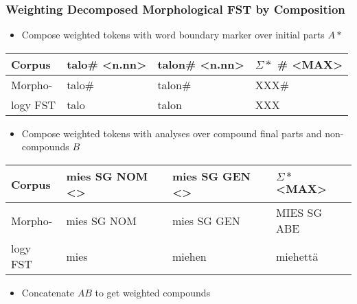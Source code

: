 \documentclass[utf8]{beamer}
\begin{document}
\begin{frame}
\frametitle{Weighting Decomposed Morphological FST by Composition}
\begin{itemize}
\item Compose weighted tokens with word boundary marker over initial parts $A*$
\end{itemize}
\begin{tabular}{l|l|l|l}
Corpus & talo\# <n.nn> & talon\# <n.nn> & $\Sigma*$ \# <MAX> \\
\hline
Morpho- & talo\# & talon\# & XXX\# \\
logy FST & talo & talon & XXX \\
\end{tabular}
\begin{itemize}
\item Compose weighted tokens with analyses over compound final parts and
non-compounds $B$
\end{itemize}
\begin{tabular}{l|l|l|l}
Corpus & mies SG NOM <> & mies SG GEN <> & $\Sigma*$ <MAX> \\
\hline
Morpho- & mies SG NOM & mies SG GEN & MIES SG ABE \\
logy FST & mies & miehen & miehettä \\
\end{tabular}
\begin{itemize}
\item Concatenate $A B$ to get weighted compounds
\end{itemize}
\end{frame}
\end{document}
